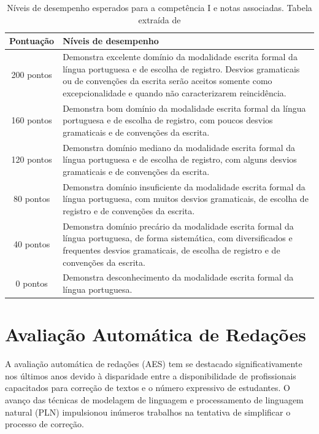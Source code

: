 \begin{table}[H]
    \centering
    \caption{Níveis de desempenho esperados para a competência I e notas associadas. Tabela extraída de \cite[p.~10]{cartilha-redacao}}
    \label{tab:competencia-1}
    \begin{tabularx}{\textwidth}{cX}
        \toprule
        \textbf{Pontuação} & \textbf{Níveis de desempenho} \\
        \midrule
        200 pontos & Demonstra excelente domínio da modalidade escrita formal da língua portuguesa e de escolha de registro. Desvios gramaticais ou de convenções da escrita serão aceitos somente como excepcionalidade e quando não caracterizarem reincidência. \\
        160 pontos & Demonstra bom domínio da modalidade escrita formal da língua portuguesa e de escolha de registro, com poucos desvios gramaticais e de convenções da escrita. \\
        120 pontos & Demonstra domínio mediano da modalidade escrita formal da língua portuguesa e de escolha de registro, com alguns desvios gramaticais e de convenções da escrita. \\
        80 pontos & Demonstra domínio insuficiente da modalidade escrita formal da língua portuguesa, com muitos desvios gramaticais, de escolha de registro e de convenções da escrita. \\
        40 pontos & Demonstra domínio precário da modalidade escrita formal da língua portuguesa, de forma sistemática, com diversificados e frequentes desvios gramaticais, de escolha de registro e de convenções da escrita. \\
        0 pontos & Demonstra desconhecimento da modalidade escrita formal da língua portuguesa. \\
        \bottomrule
    \end{tabularx}
\end{table}

\section{Avaliação Automática de Redações}

A avaliação automática de redações (AES) tem se destacado significativamente nos últimos anos devido à disparidade entre a disponibilidade de profissionais capacitados para correção de textos e o número expressivo de estudantes. O avanço das técnicas de modelagem de linguagem e processamento de linguagem natural (PLN) impulsionou inúmeros trabalhos na tentativa de simplificar o processo de correção.

